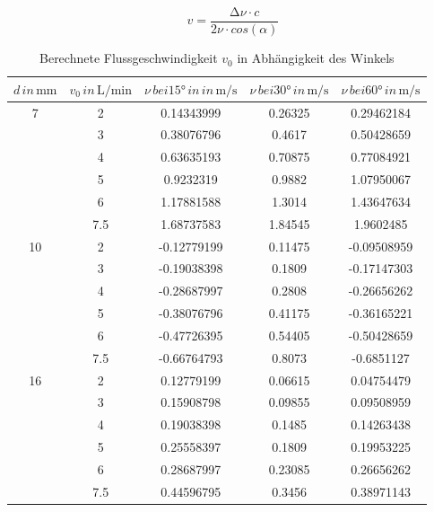 \begin{equation}
    \label{equ:Geschw}
    v = \frac{\increment \nu \cdot c}{2\nu \cdot cos(\alpha)}
\end{equation}


\begin{table}
    \centering
    \caption{Berechnete Flussgeschwindigkeit $v_0$ in Abhängigkeit des Winkels}
    \begin{tabular}{c | c c c c}
        \toprule
        {$d \, in \, \si{\milli\meter} $} & {$v_0 \, in \, \si{\liter\per\minute}$} & {$\nu \, bei 15° \, in \,in \, \si{\meter\per\second}$} & {$\nu \, bei 30° \, in \, \si{\meter\per\second}$} & {$\nu \, bei 60° \, in \, \si{\meter\per\second}$} \\
        \midrule
    7 &    2     &      0.14343999    &      0.26325   &      0.29462184 \\
     &    3      &     0.38076796    &     0.4617    &     0.50428659 \\
     &    4      &     0.63635193    &     0.70875    &     0.77084921 \\
     &    5      &     0.9232319    &     0.9882    &     1.07950067 \\
     &    6      &     1.17881588    &     1.3014    &     1.43647634 \\
     &    7.5    &     1.68737583    &     1.84545   &     1.9602485 \\
    \midrule
    10 &    2     &      -0.12779199  &       0.11475     &     -0.09508959  \\
     &    3       &    -0.19038398    &     0.1809      &    -0.17147303  \\
     &    4       &    -0.28687997   &     0.2808      &   -0.26656262  \\
     &    5       &    -0.38076796   &     0.41175      &   -0.36165221  \\
     &    6       &    -0.47726395   &     0.54405      &   -0.50428659  \\
     &    7.5     &    -0.66764793   &     0.8073      &   -0.6851127  \\
    \midrule
    16 &    2      &     0.12779199  &        0.06615   &       0.04754479  \\
     &    3        &   0.15908798    &      0.09855     &     0.09508959 \\
     &    4        &   0.19038398    &      0.1485    &     0.14263438 \\
     &    5        &   0.25558397    &      0.1809    &     0.19953225 \\
     &    6        &   0.28687997   &      0.23085    &     0.26656262 \\
     &    7.5      &   0.44596795   &      0.3456    &     0.38971143 \\

        \bottomrule
    \end{tabular}
    \label{tab:b}
\end{table}

